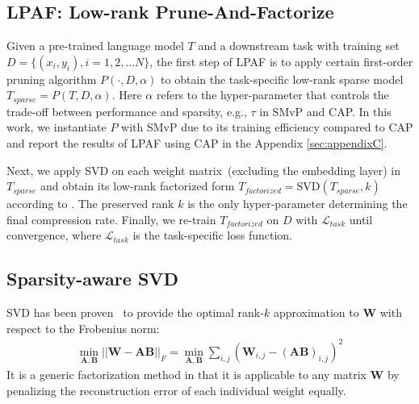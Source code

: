 \subsection{LPAF: Low-rank Prune-And-Factorize}
\label{sec:ptf}
Given a pre-trained language model $T$ and a downstream task with training set $D=\{(x_i, y_i), i=1,2,...N\}$, 
the first step of LPAF is to apply certain first-order pruning algorithm 
$P(\cdot, D, \alpha)$ to obtain the task-specific 
low-rank sparse model $T_{sparse}=P(T,D, \alpha)$. 
Here $\alpha$ refers to the hyper-parameter that controls the trade-off between performance and sparsity, e.g., $\tau$ in SMvP and CAP. In this work, we instantiate $P$ with SMvP due to its training efficiency compared to CAP and report the results of LPAF using CAP in the Appendix \ref{sec:appendixC}.

Next, we apply SVD on each weight matrix~(excluding the embedding layer) in $T_{sparse}$ and 
obtain its low-rank factorized form $T_{factorized}=\text{SVD}(T_{sparse}, k)$ 
according to . The preserved rank $k$ is the only hyper-parameter determining the final compression rate. Finally, we re-train $T_{factorized}$ on $D$ with $\mathcal{L}_{task}$ until convergence, where $\mathcal{L}_{task}$ is the task-specific loss function.
\subsection{Sparsity-aware SVD}
\label{sec:sasvd}
SVD has been proven~\cite{bestsvd} to provide the optimal rank-$k$ approximation to $\bm{W}$ with respect to the Frobenius norm:
\begin{align}
	\nonumber
	\min_{\bm{A},\bm{B}} ||\bm{W}-\bm{A}\bm{B}||_{F}=\min_{\bm{A},\bm{B}} \sum_{i,j}(\bm{W}_{i,j}-(\bm{AB})_{i,j})^2
\end{align}
It is a generic factorization method in that it is applicable to any matrix $\bm{W}$ by penalizing the reconstruction error of each individual weight equally. 

